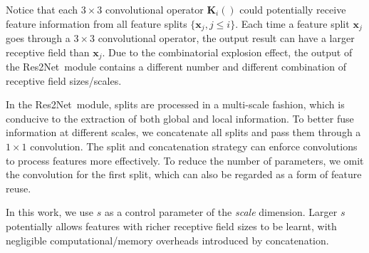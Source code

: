 \documentclass[10pt,journal,cspaper,compsoc]{IEEEtran}
\newcommand{\ourM}{{Res2Net}}
\newcommand{\tabSpace}{\vspace{6pt}}
\newcommand{\tabFormat}{\centering \renewcommand{\arraystretch}{1.05}}
\begin{document}
Notice that each $3 \times 3$ convolutional operator $\mathbf{K}_i()$
could potentially receive feature information from all feature splits
$\{\mathbf{x}_j, j \leq i\}$. 
%
Each time a feature split $\mathbf{x}_j$ goes through a $3 \times 3$
convolutional operator,
the output result can have a larger receptive field than $\mathbf{x}_j$.
%
Due to the combinatorial explosion effect,
the output of the \ourM~module contains a different number and 
different combination of receptive field sizes/scales.


In the \ourM~module,
splits are processed in a multi-scale fashion,
which is conducive to the extraction of both global and local information.
%
To better fuse information at different scales,
we concatenate all splits and pass them through a $1 \times 1$ convolution.
%
The split and concatenation strategy
can enforce convolutions
to process features more effectively.
%
To reduce the  number of parameters, we omit the convolution for the first split,
which can also be regarded as a form of feature reuse.


In this work,  we use $s$ as a control parameter of the \emph{scale} dimension.
%
Larger $s$ potentially allows features 
with richer receptive field sizes to be learnt,
with negligible computational/memory overheads introduced by concatenation.
\end{document}
